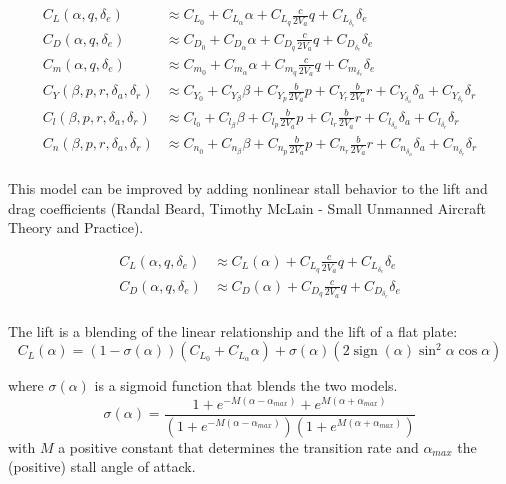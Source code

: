 \documentclass[a4paper]{paper}
\DeclareMathOperator\sign{sign}
\begin{document}
\begin{equation}
\begin{split}
    C_L(\alpha, q, \delta_e) &\approx C_{L_0} + C_{L_\alpha}\alpha + C_{L_q} \frac{c}{2V_a} q + C_{L_{\delta_e}}\delta_e \\
    C_D(\alpha, q, \delta_e) &\approx C_{D_0} + C_{D_\alpha}\alpha + C_{D_q} \frac{c}{2V_a} q + C_{D_{\delta_e}}\delta_e \\
    C_m(\alpha, q, \delta_e) &\approx C_{m_0} + C_{m_\alpha}\alpha + C_{m_q} \frac{c}{2V_a} q + C_{m_{\delta_e}} \delta_e \\
    C_Y(\beta, p, r, \delta_a, \delta_r) &\approx C_{Y_0} + C_{Y_\beta} \beta + C_{Y_p} \frac{b}{2V_a}p + C_{Y_r} \frac{b}{2V_a}r + C_{Y_{\delta_a}}\delta_a + C_{Y_{\delta_r}}\delta_r \\
    C_l(\beta, p, r, \delta_a, \delta_r) &\approx C_{l_0} + C_{l_\beta} \beta + C_{l_p} \frac{b}{2V_a}p + C_{l_r} \frac{b}{2V_a}r + C_{l_{\delta_a}}\delta_a + C_{l_{\delta_r}}\delta_r \\
    C_n(\beta, p, r, \delta_a, \delta_r) &\approx C_{n_0} + C_{n_\beta} \beta + C_{n_p} \frac{b}{2V_a}p + C_{n_r} \frac{b}{2V_a}r + C_{n_{\delta_a}}\delta_a + C_{n_{\delta_r}}\delta_r \\
\end{split}
\end{equation}

This model can be improved by adding nonlinear stall behavior to the lift and drag coefficients (Randal Beard, Timothy McLain - Small Unmanned Aircraft Theory and Practice).

\begin{equation}
\begin{split}
    C_L(\alpha, q, \delta_e) &\approx C_L(\alpha) + C_{L_q} \frac{c}{2V_a} q + C_{L_{\delta_e}}\delta_e \\
    C_D(\alpha, q, \delta_e) &\approx C_D(\alpha) + C_{D_q} \frac{c}{2V_a} q + C_{D_{\delta_e}}\delta_e \\
\end{split}
\end{equation}

The lift is a blending of the linear relationship and the lift of a flat plate:
\begin{equation}
    C_L(\alpha) = (1-\sigma(\alpha))\left(C_{L_0} + C_{L_\alpha}\alpha\right) + \sigma(\alpha)\left( 2 \sign(\alpha)\sin^2\alpha \cos\alpha \right)
\end{equation}

where $\sigma(\alpha)$ is a sigmoid function that blends the two models.
\begin{equation}
    \sigma(\alpha) = \frac{1 + e^{-M(\alpha-\alpha_{max})} + e^{M(\alpha+\alpha_{max})}}{(1+e^{-M(\alpha-\alpha_{max})})(1 + e^{M(\alpha+\alpha_{max})})}
\end{equation}
with $M$ a positive constant that determines the transition rate and $\alpha_{max}$ the (positive) stall angle of attack.
\end{document}
